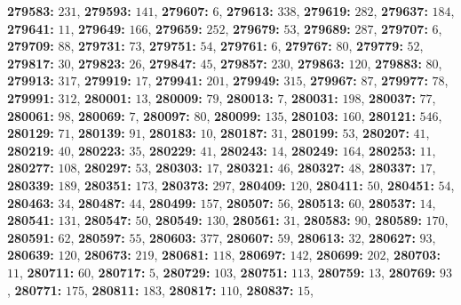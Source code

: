 \textsf{\bfseries 279583:} $231$, \textsf{\bfseries 279593:} $141$, \textsf{\bfseries 279607:} $6$, \textsf{\bfseries 279613:} $338$, \textsf{\bfseries 279619:} $282$, \textsf{\bfseries 279637:} $184$, \textsf{\bfseries 279641:} $11$, \textsf{\bfseries 279649:} $166$, \textsf{\bfseries 279659:} $252$, \textsf{\bfseries 279679:} $53$, \textsf{\bfseries 279689:} $287$, \textsf{\bfseries 279707:} $6$, \textsf{\bfseries 279709:} $88$, \textsf{\bfseries 279731:} $73$, \textsf{\bfseries 279751:} $54$, \textsf{\bfseries 279761:} $6$, \textsf{\bfseries 279767:} $80$, \textsf{\bfseries 279779:} $52$, \textsf{\bfseries 279817:} $30$, \textsf{\bfseries 279823:} $26$, \textsf{\bfseries 279847:} $45$, \textsf{\bfseries 279857:} $230$, \textsf{\bfseries 279863:} $120$, \textsf{\bfseries 279883:} $80$, \textsf{\bfseries 279913:} $317$, \textsf{\bfseries 279919:} $17$, \textsf{\bfseries 279941:} $201$, \textsf{\bfseries 279949:} $315$, \textsf{\bfseries 279967:} $87$, \textsf{\bfseries 279977:} $78$, \textsf{\bfseries 279991:} $312$, \textsf{\bfseries 280001:} $13$, \textsf{\bfseries 280009:} $79$, \textsf{\bfseries 280013:} $7$, \textsf{\bfseries 280031:} $198$, \textsf{\bfseries 280037:} $77$, \textsf{\bfseries 280061:} $98$, \textsf{\bfseries 280069:} $7$, \textsf{\bfseries 280097:} $80$, \textsf{\bfseries 280099:} $135$, \textsf{\bfseries 280103:} $160$, \textsf{\bfseries 280121:} $546$, \textsf{\bfseries 280129:} $71$, \textsf{\bfseries 280139:} $91$, \textsf{\bfseries 280183:} $10$, \textsf{\bfseries 280187:} $31$, \textsf{\bfseries 280199:} $53$, \textsf{\bfseries 280207:} $41$, \textsf{\bfseries 280219:} $40$, \textsf{\bfseries 280223:} $35$, \textsf{\bfseries 280229:} $41$, \textsf{\bfseries 280243:} $14$, \textsf{\bfseries 280249:} $164$, \textsf{\bfseries 280253:} $11$, \textsf{\bfseries 280277:} $108$, \textsf{\bfseries 280297:} $53$, \textsf{\bfseries 280303:} $17$, \textsf{\bfseries 280321:} $46$, \textsf{\bfseries 280327:} $48$, \textsf{\bfseries 280337:} $17$, \textsf{\bfseries 280339:} $189$, \textsf{\bfseries 280351:} $173$, \textsf{\bfseries 280373:} $297$, \textsf{\bfseries 280409:} $120$, \textsf{\bfseries 280411:} $50$, \textsf{\bfseries 280451:} $54$, \textsf{\bfseries 280463:} $34$, \textsf{\bfseries 280487:} $44$, \textsf{\bfseries 280499:} $157$, \textsf{\bfseries 280507:} $56$, \textsf{\bfseries 280513:} $60$, \textsf{\bfseries 280537:} $14$, \textsf{\bfseries 280541:} $131$, \textsf{\bfseries 280547:} $50$, \textsf{\bfseries 280549:} $130$, \textsf{\bfseries 280561:} $31$, \textsf{\bfseries 280583:} $90$, \textsf{\bfseries 280589:} $170$, \textsf{\bfseries 280591:} $62$, \textsf{\bfseries 280597:} $55$, \textsf{\bfseries 280603:} $377$, \textsf{\bfseries 280607:} $59$, \textsf{\bfseries 280613:} $32$, \textsf{\bfseries 280627:} $93$, \textsf{\bfseries 280639:} $120$, \textsf{\bfseries 280673:} $219$, \textsf{\bfseries 280681:} $118$, \textsf{\bfseries 280697:} $142$, \textsf{\bfseries 280699:} $202$, \textsf{\bfseries 280703:} $11$, \textsf{\bfseries 280711:} $60$, \textsf{\bfseries 280717:} $5$, \textsf{\bfseries 280729:} $103$, \textsf{\bfseries 280751:} $113$, \textsf{\bfseries 280759:} $13$, \textsf{\bfseries 280769:} $93$, \textsf{\bfseries 280771:} $175$, \textsf{\bfseries 280811:} $183$, \textsf{\bfseries 280817:} $110$, \textsf{\bfseries 280837:} $15$, 

